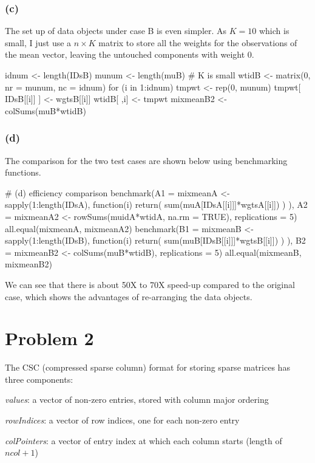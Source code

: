\documentclass{article}
\begin{document}
\subsubsection*{(c)}
The set up of data objects under case B is even simpler. As $K=10$ which is small, I just use a $n \times K$ matrix to
store all the weights for the observations of the mean vector, leaving the untouched components with weight 0.

idnum <- length(IDsB)
munum <- length(muB) # K is small
wtidB <- matrix(0, nr = munum, nc = idnum)
for (i in 1:idnum) {
	tmpwt <- rep(0, munum)
	tmpwt[ IDsB[[i]] ] <- wgtsB[[i]]
	wtidB[ ,i] <- tmpwt
}
mixmeanB2 <- colSums(muB*wtidB)

\subsubsection*{(d)}
The comparison for the two test cases are shown below using benchmarking functions.

# (d) efficiency comparison
benchmark(A1 = {mixmeanA <- sapply(1:length(IDsA), 
                            function(i){ return( sum(muA[IDsA[[i]]]*wgtsA[[i]]) ) })},
          A2 = {mixmeanA2 <- rowSums(muidA*wtidA, na.rm = TRUE)}, 
          replications = 5)
all.equal(mixmeanA, mixmeanA2)
benchmark(B1 = {mixmeanB <- sapply(1:length(IDsB), 
                            function(i){ return( sum(muB[IDsB[[i]]]*wgtsB[[i]]) ) })},
          B2 = {mixmeanB2 <- colSums(muB*wtidB)}, 
          replications = 5)
all.equal(mixmeanB, mixmeanB2)

We can see that there is about 50X to 70X speed-up compared to the original case, which shows the 
advantages of re-arranging the data objects.

\newpage
\section*{Problem 2}
The CSC (compressed sparse column) format for storing sparse matrices has three components:
\small
\begin{description}
\item \textit{values}: a vector of non-zero entries, stored with column major ordering
\item \textit{rowIndices}: a vector of row indices, one for each non-zero entry
\item \textit{colPointers}: a vector of entry index at which each column starts (length of $ncol + 1$)
\end{description}
\normalsize
\end{document}
